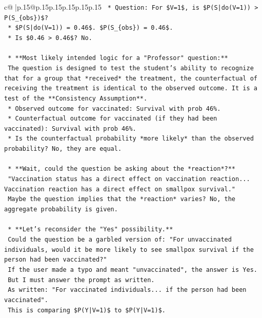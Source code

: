 \documentclass{article}
\begin{document}
{\begin{supertabular}{c@{$\;$}|p{.15\linewidth}@{}p{.15\linewidth}p{.15\linewidth}p{.15\linewidth}p{.15\linewidth}p{.15\linewidth}}
{{{\texttt{        *   Question: For \$V=1\$, is \$P(S|do(V=1)) > P(S\_\{obs\})\$?} \\
\texttt{            *   \$P(S|do(V=1)) = 0.46\$. \$P(S\_\{obs\}) = 0.46\$.} \\
\texttt{            *   Is \$0.46 > 0.46\$? No.} \\
\\ 
\texttt{    *   **Most likely intended logic for a "Professor" question:**} \\
\texttt{        The question is designed to test the student's ability to recognize that for a group that *received* the treatment, the counterfactual of receiving the treatment is identical to the observed outcome. It is a test of the **Consistency Assumption**.} \\
\texttt{        *   Observed outcome for vaccinated: Survival with prob 46\%.} \\
\texttt{        *   Counterfactual outcome for vaccinated (if they had been vaccinated): Survival with prob 46\%.} \\
\texttt{        *   Is the counterfactual probability *more likely* than the observed probability? No, they are equal.} \\
\\ 
\texttt{    *   **Wait, could the question be asking about the *reaction*?**} \\
\texttt{        "Vaccination status has a direct effect on vaccination reaction... Vaccination reaction has a direct effect on smallpox survival."} \\
\texttt{        Maybe the question implies that the *reaction* varies? No, the aggregate probability is given.} \\
\\ 
\texttt{    *   **Let's reconsider the "Yes" possibility.**} \\
\texttt{        Could the question be a garbled version of: "For unvaccinated individuals, would it be more likely to see smallpox survival if the person had been vaccinated?"} \\
\texttt{        If the user made a typo and meant "unvaccinated", the answer is Yes.} \\
\texttt{        But I must answer the prompt as written.} \\
\texttt{        As written: "For vaccinated individuals... if the person had been vaccinated".} \\
\texttt{        This is comparing \$P(Y|V=1)\$ to \$P(Y|V=1)\$.} \\
}}}
\end{supertabular}}
\end{document}
